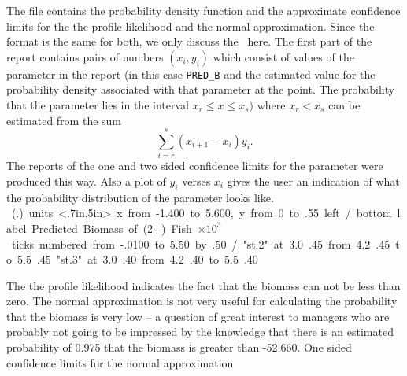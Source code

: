 \documentclass[12pt]{book}
\begin{document}
The file contains the probability density function and the 
approximate confidence limits for the the profile
likelihood and the normal approximation. Since the format is the same
for both, we only discuss the \apl\ here.
The first part of the report contains pairs of numbers 
$(x_i,y_i)$ which consist of values of the parameter in the
report (in this case {\tt PRED\_B} and the estimated value for
the probability density associated with that parameter at the point.
The probability that the parameter lies in the interval
$x_r \le x\le x_s)$ where $x_r<x_s$ can be estimated from the sum
$$\sum_{i=r}^s (x_{i+1}-x_i)y_i.$$
The reports of the one and two sided confidence limits for the parameter
were produced this way.
Also a plot of $y_i$ verses $x_i$ gives the user an indication of what
the probability distribution of the parameter looks like. 
\vbox{
\medskip
\quad\hbox{
\beginpicture
  \setplotsymbol ({\eightrm .})
  \setcoordinatesystem units <.7in,5in>
  \setplotarea x from -1.400 to 5.600, y from 0 to .55 
  \axis left 
  /
  \axis bottom label {Predicted Biomass of (2+) Fish
    $\times 10^3$} ticks
    numbered from -.0100 to 5.50 by .50 
  /
\setdashpattern <2pt,2pt,2pt,3pt>
 \plot  "st.2" 
  at 3.0 .45
 \putrule from 4.2 .45 to 5.5 .45
\setdashpattern <1pt,3pt,4pt,3pt>
 \plot  "st.3" 
  at 3.0 .40
 \putrule from 4.2 .40 to 5.5 .40
\endpicture
\hfill
}}


The the profile likelihood
indicates the fact that the biomass can not be less than zero.
The normal approximation is not very useful for calculating the probability 
that the biomass is very low -- a question of great interest 
to managers who are probably not going to be impressed by the
knowledge that there is an estimated probability of 0.975 that
the biomass is greater than -52.660.
\beginexample
One sided confidence limits for the normal approximation
\end{document}
